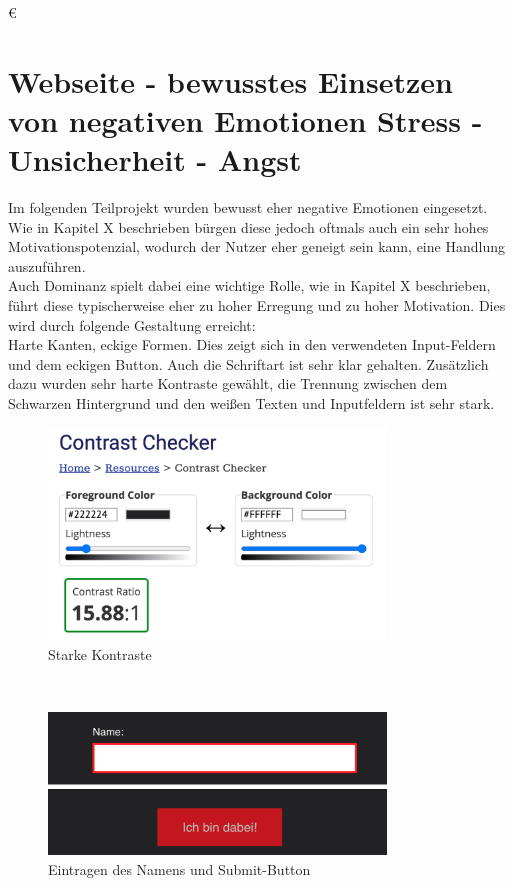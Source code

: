 €\documentclass[./dokumentation.tex]{subfiles}
\begin{document}
\section{Webseite - bewusstes Einsetzen von negativen Emotionen Stress - Unsicherheit - Angst}
Im folgenden Teilprojekt wurden bewusst eher negative Emotionen eingesetzt. Wie in Kapitel X beschrieben bürgen diese jedoch oftmals auch ein sehr hohes Motivationspotenzial, wodurch der Nutzer eher geneigt sein kann, eine Handlung auszuführen.\\
Auch Dominanz spielt dabei eine wichtige Rolle, wie in Kapitel X beschrieben, führt diese typischerweise eher zu hoher Erregung und zu hoher Motivation. Dies wird durch folgende Gestaltung erreicht:\\
Harte Kanten, eckige Formen. Dies zeigt sich in den verwendeten Input-Feldern und dem eckigen Button. Auch die Schriftart ist sehr klar gehalten. Zusätzlich dazu wurden sehr harte Kontraste gewählt, die Trennung zwischen dem Schwarzen Hintergrund und den weißen Texten und Inputfeldern ist sehr stark.

\begin{figure}[H]
    \centering
    \includegraphics[width=0.8\textwidth]{bilder/contrast.png}
    \caption{Starke Kontraste} %
    \label{fig12:contrast}
\end{figure}\\

\begin{figure}[H]
    \centering
    \includegraphics[width=0.8\textwidth]{bilder/name-bin-dabei.png}
    \caption{Eintragen des Namens und Submit-Button} %
    \label{fig13:name}
\end{figure}\\
\end{document}
